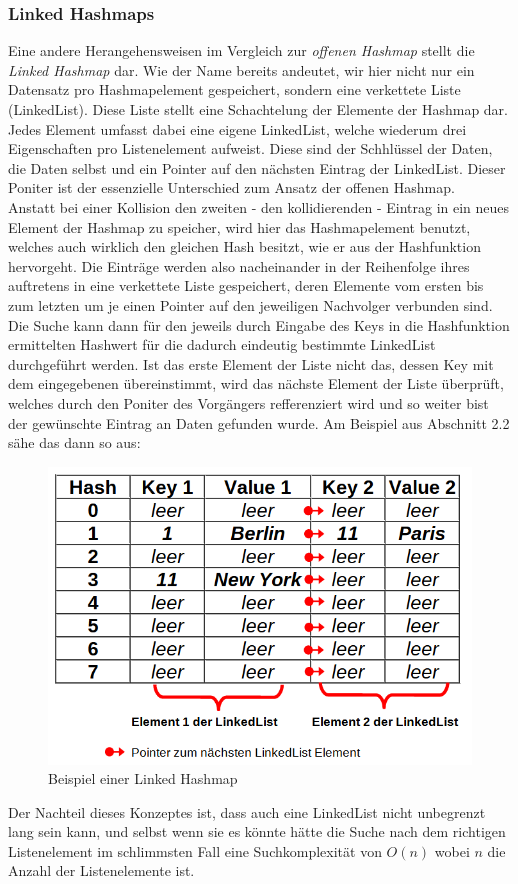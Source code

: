 \documentclass[11pt,a4paper]{article}
\begin{document}
\subsubsection{Linked Hashmaps}
Eine andere Herangehensweisen im Vergleich zur \textit{offenen Hashmap} stellt die \textit{Linked Hashmap} dar. Wie der Name bereits andeutet, wir hier nicht nur ein Datensatz pro Hashmapelement gespeichert, 
sondern eine verkettete Liste (LinkedList). Diese Liste stellt eine Schachtelung der Elemente der Hashmap dar. Jedes Element umfasst dabei eine eigene LinkedList, welche wiederum drei Eigenschaften pro
Listenelement aufweist. Diese sind der Schhlüssel der Daten, die Daten selbst und ein Pointer auf den nächsten Eintrag der LinkedList.
Dieser Poniter ist der essenzielle Unterschied zum Ansatz der offenen Hashmap.\\
Anstatt bei einer Kollision den zweiten - den kollidierenden - Eintrag in ein neues Element der Hashmap zu speicher, wird hier das Hashmapelement benutzt, welches auch wirklich den gleichen Hash besitzt, 
wie er aus der Hashfunktion hervorgeht. Die Einträge werden also nacheinander in der Reihenfolge ihres auftretens in eine verkettete Liste gespeichert, deren Elemente vom ersten bis zum letzten um je einen 
Pointer auf den jeweiligen Nachvolger verbunden sind.
Die Suche kann dann für den jeweils durch Eingabe des Keys in die Hashfunktion ermittelten Hashwert für die dadurch eindeutig bestimmte LinkedList durchgeführt werden.
Ist das erste Element der Liste nicht das, dessen Key mit dem eingegebenen übereinstimmt, wird das nächste Element der Liste überprüft, welches durch den Poniter des Vorgängers refferenziert wird und so weiter bist
der gewünschte Eintrag an Daten gefunden wurde.
Am Beispiel aus Abschnitt 2.2 sähe das dann so aus:
\pagebreak

\begin{figure}[h]
    \centering
    \includegraphics[scale=0.5]{Bilder/Hashmap_example_linked.PNG}
    \caption[Bild 1:]{Beispiel einer Linked Hashmap}
     
\end{figure}
Der Nachteil dieses Konzeptes ist, dass auch eine LinkedList nicht unbegrenzt lang sein kann, und selbst wenn sie es könnte hätte die Suche nach dem richtigen Listenelement 
im schlimmsten Fall eine Suchkomplexität von $O(n)$ wobei $n$ die Anzahl der Listenelemente ist.\\
\end{document}

